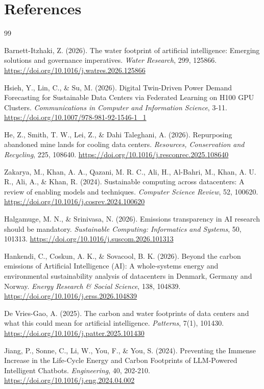 \documentclass[conference]{IEEEtran}
\begin{document}
\section*{References}

\begin{thebibliography}{99}

Barnett-Itzhaki, Z. (2026). The water footprint of artificial intelligence: Emerging solutions and governance imperatives. \textit{Water Research}, 299, 125866. \url{https://doi.org/10.1016/j.watres.2026.125866}

Hsieh, Y., Lin, C., \& Su, M. (2026). Digital Twin-Driven Power Demand Forecasting for Sustainable Data Centers via Federated Learning on H100 GPU Clusters. \textit{Communications in Computer and Information Science}, 3-11. \url{https://doi.org/10.1007/978-981-92-1546-1_1}

He, Z., Smith, T. W., Lei, Z., \& Dahi Taleghani, A. (2026). Repurposing abandoned mine lands for cooling data centers. \textit{Resources, Conservation and Recycling}, 225, 108640. \url{https://doi.org/10.1016/j.resconrec.2025.108640}

Zakarya, M., Khan, A. A., Qazani, M. R. C., Ali, H., Al-Bahri, M., Khan, A. U. R., Ali, A., \& Khan, R. (2024). Sustainable computing across datacenters: A review of enabling models and techniques. \textit{Computer Science Review}, 52, 100620. \url{https://doi.org/10.1016/j.cosrev.2024.100620}

Halgamuge, M. N., \& Srinivasa, N. (2026). Emissions transparency in AI research should be mandatory. \textit{Sustainable Computing: Informatics and Systems}, 50, 101313. \url{https://doi.org/10.1016/j.suscom.2026.101313}

Hankendi, C., Coskun, A. K., \& Sovacool, B. K. (2026). Beyond the carbon emissions of Artificial Intelligence (AI): A whole-systems energy and environmental sustainability analysis of datacenters in Denmark, Germany and Norway. \textit{Energy Research \& Social Science}, 138, 104839. \url{https://doi.org/10.1016/j.erss.2026.104839}

De Vries-Gao, A. (2025). The carbon and water footprints of data centers and what this could mean for artificial intelligence. \textit{Patterns}, 7(1), 101430. \url{https://doi.org/10.1016/j.patter.2025.101430}

Jiang, P., Sonne, C., Li, W., You, F., \& You, S. (2024). Preventing the Immense Increase in the Life-Cycle Energy and Carbon Footprints of LLM-Powered Intelligent Chatbots. \textit{Engineering}, 40, 202-210. \url{https://doi.org/10.1016/j.eng.2024.04.002}


\end{thebibliography}
\end{document}
